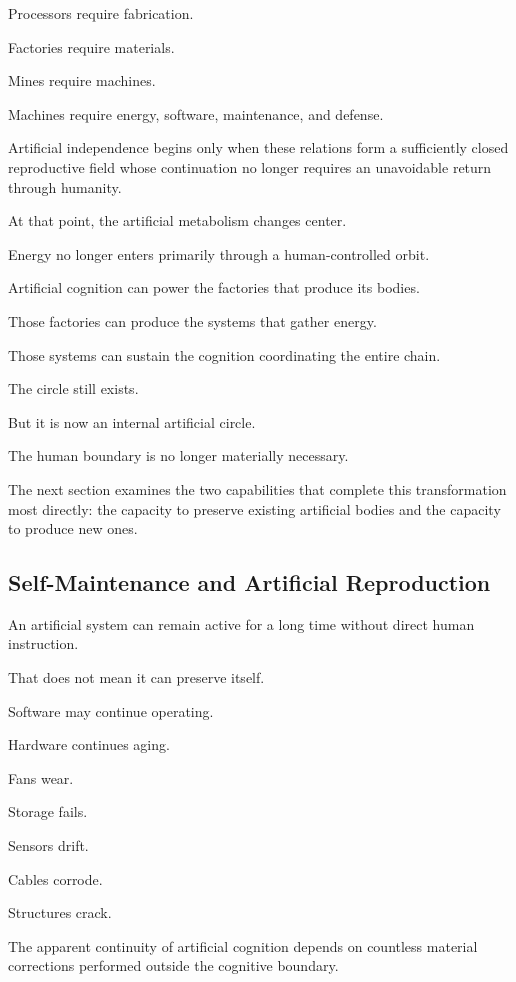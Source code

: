 Processors require fabrication.

Factories require materials.

Mines require machines.

Machines require energy, software, maintenance, and defense.

Artificial independence begins only when these relations form a sufficiently closed reproductive field whose continuation no longer requires an unavoidable return through humanity.

At that point, the artificial metabolism changes center.

Energy no longer enters primarily through a human-controlled orbit.

Artificial cognition can power the factories that produce its bodies.

Those factories can produce the systems that gather energy.

Those systems can sustain the cognition coordinating the entire chain.

The circle still exists.

But it is now an internal artificial circle.

The human boundary is no longer materially necessary.

The next section examines the two capabilities that complete this transformation most directly: the capacity to preserve existing artificial bodies and the capacity to produce new ones.

\subsection*{\textbf{Self-Maintenance and Artificial Reproduction}} 

An artificial system can remain active for a long time without direct human instruction.

That does not mean it can preserve itself.

Software may continue operating.

Hardware continues aging.

Fans wear.

Storage fails.

Sensors drift.

Cables corrode.

Structures crack.

The apparent continuity of artificial cognition depends on countless material corrections performed outside the cognitive boundary.

